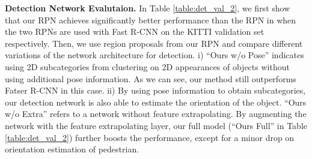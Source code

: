 \documentclass[10pt,twocolumn,letterpaper]{article}
\begin{document}
\noindent \textbf{Detection Network Evalutaion.} In Table \ref{table:det_val_2}, we first show that our RPN achieves significantly better performance than the RPN in \cite{ren2015faster} when the two RPNs are used with Fast R-CNN \cite{girshick2015fast} on the KITTI validation set respectively. Then, we use region proposals from our RPN and compare different variations of the network architecture for detection. i) ``Ours w/o Pose'' indicates using 2D subcategories from clustering on 2D appearances of objects without using additional pose information. As we can see, our method still outperforms Fatser R-CNN \cite{ren2015faster} in this case. ii) By using pose information to obtain subcategories, our detection network is also able to estimate the orientation of the object. ``Ours w/o Extra'' refers to a network without feature extrapolating. By augmenting the network with the feature extrapolating layer, our full model (``Ours Full'' in Table \ref{table:det_val_2}) further boosts the performance, except for a minor drop on orientation estimation of pedestrian.
\end{document}
